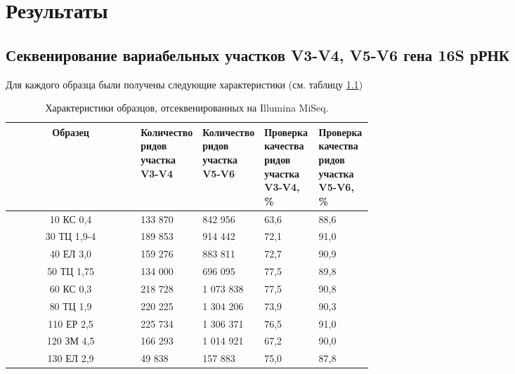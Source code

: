 \chapter{Результаты} \label{chapt2}

\section{Секвенирование вариабельных участков V3-V4, V5-V6 гена 16S рРНК} \label{sect2_1}

Для каждого образца были получены следующие характеристики (см. таблицу \ref{tab:16Sread_Ill_characteristic})

\begin{table}[H]
\caption{Характеристики образцов, отсеквенированных на Illumina MiSeq.}\label{tab:16Sread_Ill_characteristic}
\begin{center}
\begin{tabular}{|c|p{0.15\linewidth}|p{0.15\linewidth}|p{0.15\linewidth}|p{0.15\linewidth}|}
\hline
Образец & Количество ридов участка V3-V4 & Количество ридов участка V5-V6 & Проверка качества ридов участка V3-V4, \% & Проверка качества ридов участка V5-V6, \% \\
\hline
10 КС 0,4 &                                                                                                                                                                                                                                                                                                                                                                                                                                                                                                                                                                        133 870 & 842 956 & 63,6 & 88,6  \\
30 ТЦ 1,9-4 & 189 853 & 914 442 & 72,1  & 91,0  \\
40 ЕЛ 3,0 & 159 276 & 883 811 & 72,7  & 90,9  \\
50 ТЦ 1,75 & 134 000 & 696 095 & 77,5  & 89,8  \\
60 КС 0,3 & 218 728 & 1 073 838 & 77,5  & 90,8  \\
80 ТЦ 1,9 & 220 225 & 1 304 206 & 73,9  & 90,3  \\
110 ЕР 2,5 & 225 734 & 1 306 371 & 76,5  & 91,0  \\
120 ЗМ 4,5 & 166 293 & 1 014 921 & 67,2  & 90,0  \\
130 ЕЛ 2,9 & 49 838 & 157 883 & 75,0  & 87,8  \\
\hline
\end{tabular}
\end{center}
\end{table}

